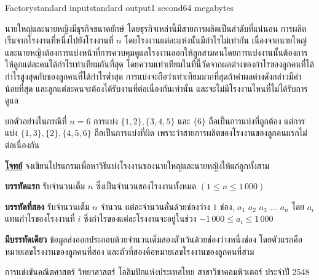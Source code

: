 \documentclass[11pt,a4paper]{article}
\begin{document}
\begin{problem}{Factory}{standard input}{standard output}{1 second}{64 megabytes}

นายใหญ่และนายหญิงมีธุรกิจขนาดยักษ์ โดยธุรกิจเหล่านี้มีสายการผลิตเป็นลำดับที่แน่นอน การผลิตเริ่มจากโรงงานที่หนึ่งไปยังโรงงานที่ $n$ โดยโรงงานแต่ละแห่งนั้นมีกำไรไม่เท่ากัน เนื่องจากนายใหญ่และนายหญิงต้องการแบ่งหน้าที่การควบคุมดูแลโรงงานออกให้ลูกสามคนโดยการแบ่งงานนั้นต้องการให้ลูกแต่ละคนได้กำไรเท่าเทียมกันที่สุด โดยความเท่าเทียมในที่นี้วัดจากผลต่างของกำไรของลูกคนที่ได้กำไรสูงสุดกับของลูกคนที่ได้กำไรต่ำสุด การแบ่งจะถือว่าเท่าเทียมมากที่สุดถ้าค่าผลต่างดังกล่าวมีค่าน้อยที่สุด และลูกแต่ละคนจะต้องได้รับงานที่ต่อเนื่องกันเท่านั้น และจะไม่มีโรงงานไหนที่ไม่ได้รับการดูแล

ยกตัวอย่างในกรณีที่ $n=6$ การแบ่ง $\{1,2\}, \{3,4,5\}$ และ $\{6\}$ ถือเป็นการแบ่งที่ถูกต้อง แต่การแบ่ง $\{1,3\}, \{2\}, \{4,5,6\}$ ถือเป็นการแบ่งที่ผิด เพราะว่าสายการผลิตของโรงงานของลูกคนแรกไม่ต่อเนื่องกัน

\bigskip
\underline{\textbf{โจทย์}}  จงเขียนโปรแกรมเพื่อหาวิธีแบ่งโรงงานของนายใหญ่และนายหญิงให้แก่ลูกทั้งสาม

\InputFile

\textbf{บรรทัดแรก} รับจำนวนเต็ม $n$ ซึ่งเป็นจำนวนของโรงงานทั้งหมด $(1 \leq n \leq 1\,000)$ 

\textbf{บรรทัดที่สอง}  รับจำนวนเต็ม $n$ จำนวน แต่ละจำนวนคั่นด้วยช่องว่าง $1$ ช่อง, $a_1$ $a_2$ $a_3$ ... $a_n$ โดย $a_i$ แทนกำไรของโรงงานที่ $i$ ซึ่งกำไรของแต่ละโรงงานจะอยู่ในช่วง $-1\,000 \leq a_i \leq 1\,000$

\OutputFile

\textbf{มีบรรทัดเดียว} ข้อมูลส่งออกประกอบด้วยจำนวนเต็มสองตัวเว้นด้วยช่องว่างหนึ่งช่อง โดยตัวแรกคือหมายเลขโรงงานของลูกคนที่สอง และตัวที่สองคือหมายเลขโรงงานของลูกคนที่สาม

\Examples

\begin{example}
%
\end{example}


\Source

การแข่งขันคณิตศาสตร์ วิทยาศาสตร์ โอลิมปิกแห่งประเทศไทย สาขาวิชาคอมพิวเตอร์ ประจำปี 2548

\end{problem}
\end{document}
